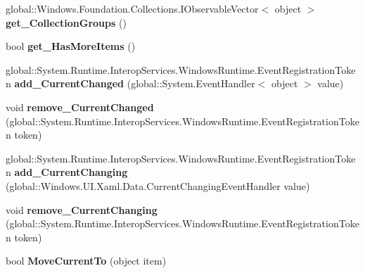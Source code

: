 \begin{DoxyCompactItemize}
global\+::\+Windows.\+Foundation.\+Collections.\+I\+Observable\+Vector$<$ object $>$ {\bfseries get\+\_\+\+Collection\+Groups} ()
\item 
\mbox{\label{interface_windows_1_1_u_i_1_1_xaml_1_1_data_1_1_i_collection_view_aec8115295fb03164ca68a5a9f2651054}} 
bool {\bfseries get\+\_\+\+Has\+More\+Items} ()
\item 
\mbox{\label{interface_windows_1_1_u_i_1_1_xaml_1_1_data_1_1_i_collection_view_a617dea4435e2a2a52dc87193df28e8dc}} 
global\+::\+System.\+Runtime.\+Interop\+Services.\+Windows\+Runtime.\+Event\+Registration\+Token {\bfseries add\+\_\+\+Current\+Changed} (global\+::\+System.\+Event\+Handler$<$ object $>$ value)
\item 
\mbox{\label{interface_windows_1_1_u_i_1_1_xaml_1_1_data_1_1_i_collection_view_a44b0918807f968027d0578f623c02f67}} 
void {\bfseries remove\+\_\+\+Current\+Changed} (global\+::\+System.\+Runtime.\+Interop\+Services.\+Windows\+Runtime.\+Event\+Registration\+Token token)
\item 
\mbox{\label{interface_windows_1_1_u_i_1_1_xaml_1_1_data_1_1_i_collection_view_afb83479ac9e19cc076a82ee507d64a75}} 
global\+::\+System.\+Runtime.\+Interop\+Services.\+Windows\+Runtime.\+Event\+Registration\+Token {\bfseries add\+\_\+\+Current\+Changing} (global\+::\+Windows.\+U\+I.\+Xaml.\+Data.\+Current\+Changing\+Event\+Handler value)
\item 
\mbox{\label{interface_windows_1_1_u_i_1_1_xaml_1_1_data_1_1_i_collection_view_aaeb8082e843bdfe31cc2c2cde59291c9}} 
void {\bfseries remove\+\_\+\+Current\+Changing} (global\+::\+System.\+Runtime.\+Interop\+Services.\+Windows\+Runtime.\+Event\+Registration\+Token token)
\item 
\mbox{\label{interface_windows_1_1_u_i_1_1_xaml_1_1_data_1_1_i_collection_view_aa3e3071eca08209ea25a6a0bb1f3171c}} 
bool {\bfseries Move\+Current\+To} (object item)

\end{DoxyCompactItemize}

